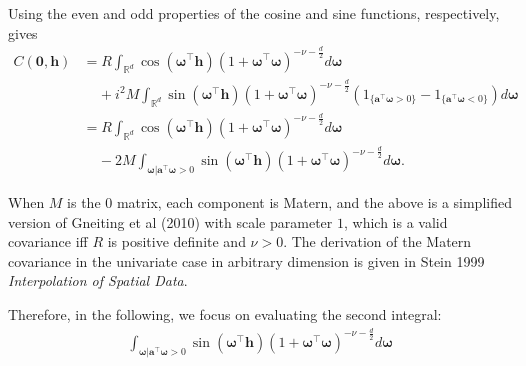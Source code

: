 \documentclass[11pt]{article}
\newcommand{\vint}{\boldsymbol{\omega}}
\newcommand{\vpla}{\boldsymbol{a}}
\begin{document}
Using the even and odd properties of the cosine and sine functions, respectively, gives
\begin{align*}
C(\boldsymbol{0}, \boldsymbol{h})&=R\int_{\mathbb{R}^d}\cos(\vint^\top \boldsymbol{h})(1 + \vint^\top \vint)^{-\nu- \frac{d}{2}} d\vint \\
& \ \ \ \ \ + i^2M\int_{\mathbb{R}^d}\sin(\vint^\top \boldsymbol{h})(1 + \vint^\top \vint)^{-\nu- \frac{d}{2}} \left(1_{\{\vpla^\top\vint > 0\}}  - 1_{\{\vpla^\top\vint < 0\}}\right) d\vint \\
&=R\int_{\mathbb{R}^d}\cos(\vint^\top \boldsymbol{h})(1 + \vint^\top \vint)^{-\nu- \frac{d}{2}} d\vint \\
& \ \ \ \ \ -2M\int_{\vint | \vpla^\top\vint > 0}\sin(\vint^\top \boldsymbol{h})(1 + \vint^\top \vint)^{-\nu- \frac{d}{2}} d\vint .%
\end{align*}%

When $M$ is the $0$ matrix, each component is Matern, and the above is a simplified version of Gneiting et al (2010) with scale parameter $1$, which is a valid covariance iff $R$ is positive definite and $\nu > 0$. The derivation of the Matern covariance in the univariate case in arbitrary dimension is given in Stein 1999 \textit{Interpolation of Spatial Data}.



 Therefore, in the following, we focus on evaluating the second integral: \begin{align}
\int_{\vint | \vpla^\top\vint > 0}\sin(\vint^\top \boldsymbol{h})(1 + \vint^\top \vint)^{-\nu- \frac{d}{2}} d\vint \label{toughintegral}
\end{align}

% 
\end{document}

